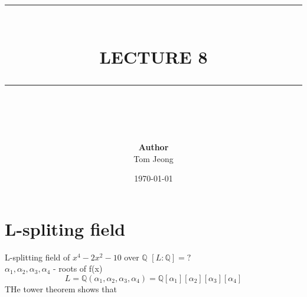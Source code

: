 \documentclass{article}
\newcommand{\HRule}[1]{\rule{\linewidth}{#1}}
\begin{document}

\title{ \normalsize \textsc{}
		\\ [2.0cm]
		\HRule{1.5pt} \\
		\LARGE \textbf{\uppercase{Lecture 8}}
		\HRule{2.0pt} \\ [0.6cm] \LARGE{}
		}

\date{\today}
\author{\textbf{Author} \\ 
		Tom Jeong
        }

\maketitle

\tableofcontents
\newpage

\section{L-spliting field}
L-splitting field of $x^4 - 2x^2 - 10$ over $\mathbb{Q}$
$[L:\mathbb{Q}] = ?$ \\ $\alpha_1, \alpha_2, \alpha_3, \alpha_4$ - roots of f(x) 
$$L = \mathbb{Q}(\alpha_1, \alpha_2, \alpha_3, \alpha_4) = \mathbb{Q}[\alpha_1][\alpha_2][\alpha_3][\alpha_4]$$
THe tower theorem shows that 
\end{document}
